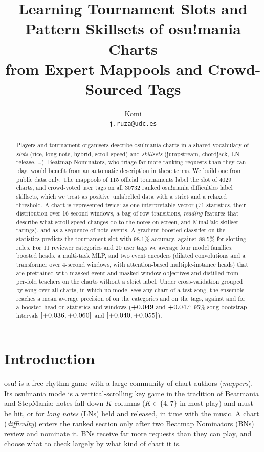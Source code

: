 \documentclass[10pt,twocolumn]{article}
\title{\bfseries Learning Tournament Slots and Pattern Skillsets of osu!mania Charts\\from Expert Mappools and Crowd-Sourced Tags}
\author{Komi\\\small\texttt{j.ruza@udc.es}}
\date{}
\begin{document}
\maketitle

\begin{abstract}
Players and tournament organisers describe osu!mania charts in a shared vocabulary of \emph{slots} (rice, long note, hybrid, scroll speed) and \emph{skillsets} (jumpstream, chordjack, LN release, \dots). Beatmap Nominators, who triage far more ranking requests than they can play, would benefit from an automatic description in these terms. We build one from public data only. The mappools of 115 official tournaments label the slot of \num{4029} charts, and crowd-voted user tags on all \num{30732} ranked osu!mania difficulties label skillsets, which we treat as positive--unlabelled data with a strict and a relaxed threshold. A chart is represented twice: as one interpretable vector (71 statistics, their distribution over 16-second windows, a bag of row transitions, \emph{reading} features that describe what scroll-speed changes do to the notes on screen, and MinaCalc skillset ratings), and as a sequence of note events. A gradient-boosted classifier on the statistics predicts the tournament slot with 98.1\% accuracy, against 88.5\% for slotting rules. For 11 reviewer categories and 20 user tags we average four model families: boosted heads, a multi-task MLP, and two event encoders (dilated convolutions and a transformer over 4-second windows, with attention-based multiple-instance heads) that are pretrained with masked-event and masked-window objectives and distilled from per-fold teachers on the \nUnlab{} charts without a strict label. Under cross-validation grouped by song over all \nCharts{} charts, in which no model sees any chart of a test song, the ensemble reaches a mean average precision of \catEns{} on the categories and \tagEns{} on the tags, against \catBase{} and \tagBase{} for a boosted head on statistics and windows ($+0.049$ and $+0.047$; 95\% song-bootstrap intervals $[+0.036, +0.060]$ and $[+0.040, +0.055]$).
\end{abstract}

\section{Introduction}

osu! is a free rhythm game with a large community of chart authors (\emph{mappers}). Its osu!mania mode is a vertical-scrolling key game in the tradition of Beatmania and StepMania: notes fall down $K$ columns ($K\in\{4,7\}$ in most play) and must be hit, or for \emph{long notes} (LNs) held and released, in time with the music. A chart (\emph{difficulty}) enters the ranked section only after two Beatmap Nominators (BNs) review and nominate it. BNs receive far more requests than they can play, and choose what to check largely by what kind of chart it is.
\end{document}
